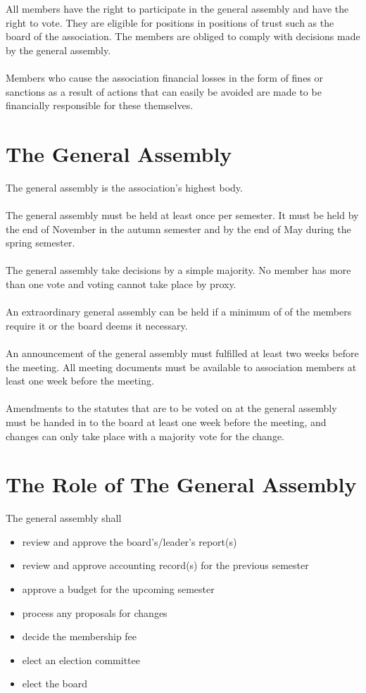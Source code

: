 \documentclass[12pt,a4paper,norsk]{article}
\begin{document}
All members have the right to participate in the general assembly and have the right to vote. They are eligible for positions in positions of trust such as the board of the association. The members are obliged to comply with decisions made by the general assembly.
\\
\\
Members who cause the association financial losses in the form of fines or sanctions as a result
of actions that can easily be avoided are made to be financially responsible for these themselves.

\section{The General Assembly}

The general assembly is the association's highest body.
\\
\\
The general assembly must be held at least once per semester. It must be held by the end of November in the autumn semester and by the end of May during the spring semester.
\\
\\
The general assembly take decisions by a simple majority. No member has more than one vote and voting cannot take place by proxy.
\\
\\
An extraordinary general assembly can be held if a minimum of  of the members require it
or the board deems it necessary.
\\
\\
An announcement of the general assembly must fulfilled at least two weeks before
the meeting. All meeting documents must be available to association members at least one week before the meeting.
\\
\\
Amendments to the statutes that are to be voted on at the general assembly must be handed in to the board
at least one week before the meeting, and changes can only take place with a  majority vote for the change.


\section{The Role of The General Assembly}

The general assembly shall

\begin{itemize}
    \item review and approve the board's/leader's report(s)
    \item review and approve accounting record(s) for the previous semester
    \item approve a budget for the upcoming semester
    \item process any proposals for changes
    \item decide the membership fee
    \item elect an election committee
    \item elect the board
\end{itemize}
\end{document}

